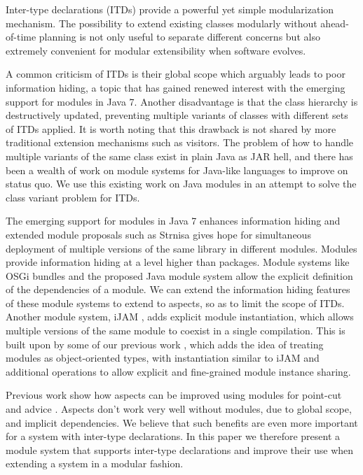 Inter-type declarations (ITDs) provide a powerful yet simple modularization
mechanism. The possibility to extend existing classes modularly without
ahead-of-time planning is not only useful to separate different concerns
but also extremely convenient for modular extensibility when software
evolves.

A common criticism of ITDs is their global scope which arguably leads to
poor information hiding, a topic that has gained renewed interest with the 
emerging support for modules in Java 7. Another disadvantage is that the 
class hierarchy is destructively updated, preventing multiple variants of 
classes with different sets of ITDs applied. It is worth noting that 
this drawback is not shared by more traditional extension mechanisms such 
as visitors. The problem of how to handle multiple variants of the same 
class exist in plain Java as JAR hell, and there has been a wealth of work 
on module systems for Java-like languages to improve on status quo. We use 
this existing work on Java modules in an attempt to solve the class 
variant problem for ITDs.

The emerging support for modules in Java 7 enhances information hiding and
extended module proposals such as Strnisa gives hope for simultaneous
deployment of multiple versions of the same library in different modules.
Modules provide information hiding at a level higher than packages. Module
systems like OSGi bundles\cite{OSGi4} and the proposed Java module system\cite{JSR277}
allow the explicit definition of the dependencies of a module. We can extend
the information hiding features of these module systems to extend to aspects, 
so as to limit the scope of ITDs.
Another module system, iJAM \cite{iJAM}, adds explicit module instantiation, 
which allows multiple versions of the same module to coexist in a single compilation.
This is built upon by some of our previous work \cite{modulesastypes}, which 
adds the idea of treating modules as object-oriented types, with instantiation
similar to iJAM and additional operations to allow explicit and fine-grained
module instance sharing. 



Previous work show how aspects can be improved using modules for point-cut
and advice \cite{openmodulesaj}. Aspects don't work very well without 
modules, due to global scope, and implicit dependencies. We believe that 
such benefits are even more important for a system with inter-type 
declarations. In this paper we therefore present a module system that 
supports inter-type declarations and improve their use when extending a 
system in a modular fashion.

